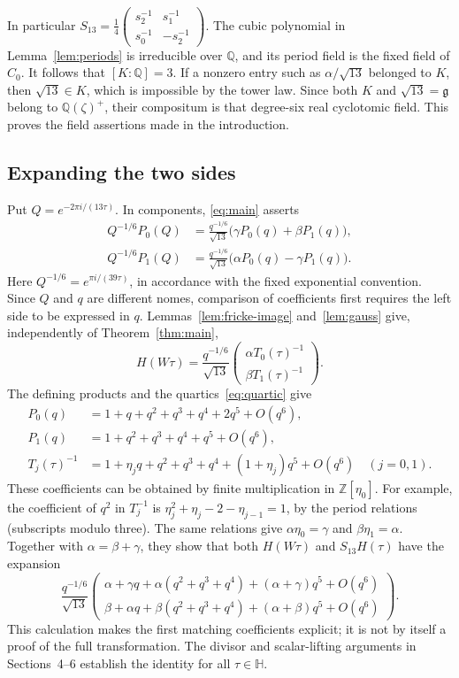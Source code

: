 \documentclass[11pt]{amsart}
\theoremstyle{remark}
\newcommand{\HH}{\mathbb H}
\newcommand{\QQ}{\mathbb Q}
\newcommand{\ZZ}{\mathbb Z}
\begin{document}
In particular $S_{13}=\frac14\left(\begin{smallmatrix}s_2^{-1}&s_1^{-1}\\s_0^{-1}&-s_2^{-1}\end{smallmatrix}\right)$.
The cubic polynomial in Lemma~\ref{lem:periods} is irreducible over $\QQ$, and its period field is the fixed field of $C_0$. It follows that $[K:\QQ]=3$. If a nonzero entry such as $\alpha/\sqrt{13}$ belonged to $K$, then $\sqrt{13}\in K$, which is impossible by the tower law. Since both $K$ and $\sqrt{13}=\mathfrak g$ belong to $\QQ(\zeta)^+$, their compositum is that degree-six real cyclotomic field. This proves the field assertions made in the introduction.

\subsection{Expanding the two sides}\label{subsec:expansion}
Put $Q=e^{-2\pi i/(13\tau)}$. In components, \eqref{eq:main} asserts
\begin{align*}
 Q^{-1/6}P_0(Q)&=\frac{q^{-1/6}}{\sqrt{13}}
                  \bigl(\gamma P_0(q)+\beta P_1(q)\bigr),\\
 Q^{-1/6}P_1(Q)&=\frac{q^{-1/6}}{\sqrt{13}}
                  \bigl(\alpha P_0(q)-\gamma P_1(q)\bigr).
\end{align*}
Here $Q^{-1/6}=e^{\pi i/(39\tau)}$, in accordance with the fixed
exponential convention. Since $Q$ and $q$ are different nomes, comparison
of coefficients first requires the left side to be expressed in $q$.
Lemmas~\ref{lem:fricke-image} and~\ref{lem:gauss} give, independently of
Theorem~\ref{thm:main},
\[
 H(W\tau)=\frac{q^{-1/6}}{\sqrt{13}}
 \begin{pmatrix}\alpha T_0(\tau)^{-1}\\\beta T_1(\tau)^{-1}\end{pmatrix}.
\]
The defining products and the quartics~\eqref{eq:quartic} give
\begin{align*}
 P_0(q)&=1+q+q^2+q^3+q^4+2q^5+O(q^6),\\
 P_1(q)&=1+q^2+q^3+q^4+q^5+O(q^6),\\
 T_j(\tau)^{-1}&=1+\eta_jq+q^2+q^3+q^4+(1+\eta_j)q^5+O(q^6)
 \quad(j=0,1).
\end{align*}
These coefficients can be obtained by finite multiplication in
$\ZZ[\eta_0]$. For example, the coefficient of $q^2$ in $T_j^{-1}$ is
$\eta_j^2+\eta_j-2-\eta_{j-1}=1$, by the period relations
(subscripts modulo three). The same relations give
$\alpha\eta_0=\gamma$ and $\beta\eta_1=\alpha$.
Together with $\alpha=\beta+\gamma$, they show that both
$H(W\tau)$ and $S_{13}H(\tau)$ have the expansion
\[
 \frac{q^{-1/6}}{\sqrt{13}}
 \begin{pmatrix}
 \alpha+\gamma q+\alpha(q^2+q^3+q^4)+(\alpha+\gamma)q^5+O(q^6)\\
 \beta+\alpha q+\beta(q^2+q^3+q^4)+(\alpha+\beta)q^5+O(q^6)
 \end{pmatrix}.
\]
This calculation makes the first matching coefficients explicit; it is not
by itself a proof of the full transformation. The divisor and
scalar-lifting arguments in Sections~4--6 establish the identity for all
$\tau\in\HH$.
\end{document}
